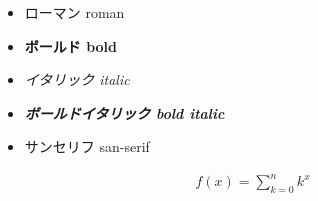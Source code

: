 \documentclass[fontsize=10.5bp]{jlreq}
\begin{document}
\begin{itemize}
	\item \textrm{ローマン roman}
	\item \textbf{ボールド bold}
	\item \textit{イタリック italic}
	\item \textbf{\textit{ボールドイタリック bold italic}}
	\item \textsf{サンセリフ san-serif}
\end{itemize}

\begin{align}
	f(x) = \sum_{k=0}^{n} k^{x}
\end{align}
\end{document}
